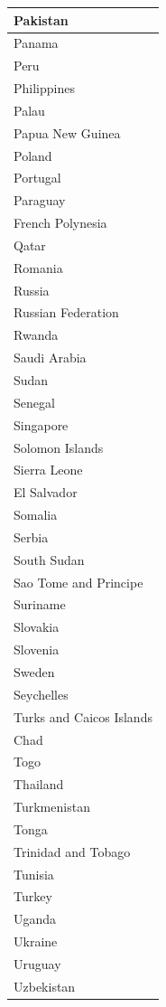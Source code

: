 \documentclass[]{article}
\begin{document}
\begin{table}
\begin{tabular}[t]{l}
Pakistan\\
\hline
Panama\\
\hline
Peru\\
\hline
Philippines\\
\hline
Palau\\
\hline
Papua New Guinea\\
\hline
Poland\\
\hline
Portugal\\
\hline
Paraguay\\
\hline
French Polynesia\\
\hline
Qatar\\
\hline
Romania\\
\hline
Russia\\
\hline
Russian Federation\\
\hline
Rwanda\\
\hline
Saudi Arabia\\
\hline
Sudan\\
\hline
Senegal\\
\hline
Singapore\\
\hline
Solomon Islands\\
\hline
Sierra Leone\\
\hline
El Salvador\\
\hline
Somalia\\
\hline
Serbia\\
\hline
South Sudan\\
\hline
Sao Tome and Principe\\
\hline
Suriname\\
\hline
Slovakia\\
\hline
Slovenia\\
\hline
Sweden\\
\hline
Seychelles\\
\hline
Turks and Caicos Islands\\
\hline
Chad\\
\hline
Togo\\
\hline
Thailand\\
\hline
Turkmenistan\\
\hline
Tonga\\
\hline
Trinidad and Tobago\\
\hline
Tunisia\\
\hline
Turkey\\
\hline
Uganda\\
\hline
Ukraine\\
\hline
Uruguay\\
\hline
Uzbekistan\\
\hline

\end{tabular}
\end{table}
\end{document}
